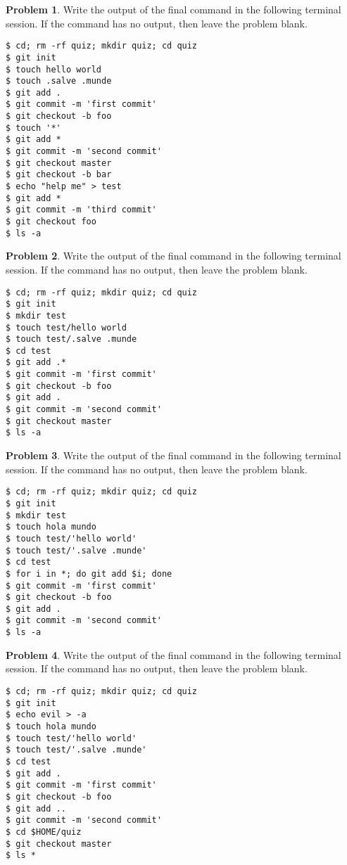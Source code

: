 \documentclass[10pt]{article}
\theoremstyle{definition}
\newtheorem{problem}{Problem}
\begin{document}
\filbreak
\begin{problem}
    Write the output of the final command in the following terminal session.
    If the command has no output, then leave the problem blank.
\end{problem}
\begin{lstlisting}
$ cd; rm -rf quiz; mkdir quiz; cd quiz
$ git init
$ touch hello world
$ touch .salve .munde
$ git add .
$ git commit -m 'first commit'
$ git checkout -b foo
$ touch '*'
$ git add *
$ git commit -m 'second commit'
$ git checkout master
$ git checkout -b bar
$ echo "help me" > test
$ git add *
$ git commit -m 'third commit'
$ git checkout foo
$ ls -a
\end{lstlisting}


\filbreak
\begin{problem}
    Write the output of the final command in the following terminal session.
    If the command has no output, then leave the problem blank.
\end{problem}
\begin{lstlisting}
$ cd; rm -rf quiz; mkdir quiz; cd quiz
$ git init
$ mkdir test
$ touch test/hello world
$ touch test/.salve .munde
$ cd test
$ git add .*
$ git commit -m 'first commit'
$ git checkout -b foo
$ git add .
$ git commit -m 'second commit'
$ git checkout master
$ ls -a
\end{lstlisting}


\filbreak
\begin{problem}
    Write the output of the final command in the following terminal session.
    If the command has no output, then leave the problem blank.
\end{problem}
\begin{lstlisting}
$ cd; rm -rf quiz; mkdir quiz; cd quiz
$ git init
$ mkdir test
$ touch hola mundo
$ touch test/'hello world'
$ touch test/'.salve .munde'
$ cd test
$ for i in *; do git add $i; done
$ git commit -m 'first commit'
$ git checkout -b foo
$ git add .
$ git commit -m 'second commit'
$ ls -a
\end{lstlisting}

\filbreak
\begin{problem}
    Write the output of the final command in the following terminal session.
    If the command has no output, then leave the problem blank.
\end{problem}
\begin{lstlisting}
$ cd; rm -rf quiz; mkdir quiz; cd quiz
$ git init
$ echo evil > -a
$ touch hola mundo
$ touch test/'hello world'
$ touch test/'.salve .munde'
$ cd test
$ git add .
$ git commit -m 'first commit'
$ git checkout -b foo
$ git add ..
$ git commit -m 'second commit'
$ cd $HOME/quiz
$ git checkout master
$ ls *
\end{lstlisting}
\end{document}
